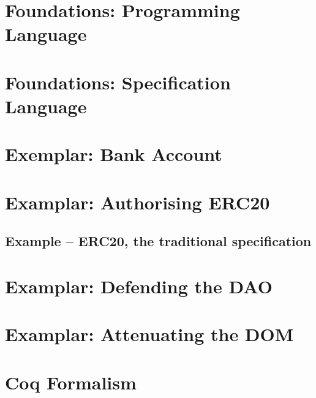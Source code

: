 \documentclass[runningheads]{llncs}
\begin{document}
\newpage
\appendix

\section{Foundations: Programming Language}
\label{app:LangOO}


\clearpage

\section{Foundations: Specification Language}
\label{app:assertions}


\clearpage

\section{Exemplar: Bank Account}
\label{Bank:appendix}


\clearpage

\section{Examplar: Authorising ERC20}
\label{sect:example:ERC20}
{}

\clearpage

\subsection{Example -- ERC20, the traditional specification }
\label{ERC20:appendix}


\clearpage

\section{Examplar: Defending the DAO}
\label{Dao:appendix}


\clearpage

\section{Examplar: Attenuating the DOM}
\label{sect:example:DOM}


\clearpage

\section{Coq Formalism}
\label{sect:coq}


\end{document}

